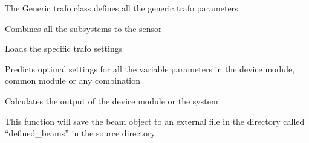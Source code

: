 \documentclass[letterpaper,10pt,english]{sphinxmanual}
\begin{document}
\begin{fulllineitems}
\label{device_modules:TrafoModule.generictrafo}
The Generic trafo class defines all the generic trafo parameters

\begin{fulllineitems}
\label{device_modules:TrafoModule.generictrafo.combine_systems}
Combines all the subsystems to the sensor

\end{fulllineitems}


\begin{fulllineitems}
\label{device_modules:TrafoModule.generictrafo.load}
Loads the specific trafo settings

\end{fulllineitems}


\begin{fulllineitems}
\label{device_modules:TrafoModule.generictrafo.optimize}
Predicts optimal settings for all the variable parameters in the device module, common module or any combination

\end{fulllineitems}


\begin{fulllineitems}
\label{device_modules:TrafoModule.generictrafo.output}
Calculates the output of the device module or the system

\end{fulllineitems}


\begin{fulllineitems}
\label{device_modules:TrafoModule.generictrafo.save}
This function will save the beam object to an external file in the directory called ``defined\_beams'' in the source directory

\end{fulllineitems}


\end{fulllineitems}
\end{document}
